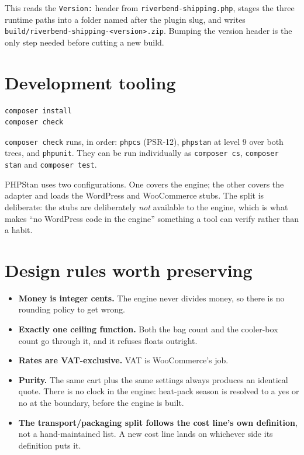 \documentclass[11pt,a4paper,oneside]{report}
\newcommand{\opt}[1]{\texttt{\small #1}}
\begin{document}
This reads the \opt{Version:} header from \opt{riverbend-shipping.php}, stages the three
runtime paths into a folder named after the plugin slug, and writes
\opt{build/riverbend-shipping-<version>.zip}. Bumping the version header is the only
step needed before cutting a new build.

\section{Development tooling}

\begin{lstlisting}[language=bash]
composer install
composer check
\end{lstlisting}

\opt{composer check} runs, in order: \opt{phpcs} (PSR-12), \opt{phpstan} at level 9
over both trees, and \opt{phpunit}. They can be run individually as \opt{composer cs},
\opt{composer stan} and \opt{composer test}.

PHPStan uses two configurations. One covers the engine; the other covers the adapter
and loads the WordPress and WooCommerce stubs. The split is deliberate: the stubs
are deliberately \emph{not} available to the engine, which is what makes ``no
WordPress code in the engine'' something a tool can verify rather than a habit.

\section{Design rules worth preserving}

\begin{itemize}
  \item \textbf{Money is integer cents.} The engine never divides money, so there is no
        rounding policy to get wrong.
  \item \textbf{Exactly one ceiling function.} Both the bag count and the cooler-box
        count go through it, and it refuses floats outright.
  \item \textbf{Rates are VAT-exclusive.} VAT is WooCommerce's job.
  \item \textbf{Purity.} The same cart plus the same settings always produces an
        identical quote. There is no clock in the engine: heat-pack season is
        resolved to a yes or no at the boundary, before the engine is built.
  \item \textbf{The transport/packaging split follows the cost line's own definition},
        not a hand-maintained list. A new cost line lands on whichever side its
        definition puts it.
\end{itemize}
\end{document}
